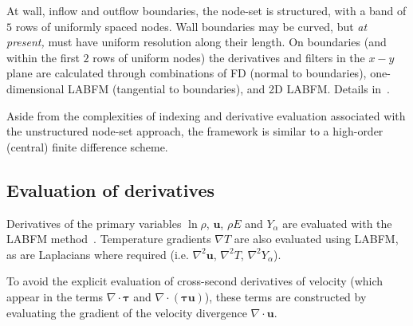\documentclass[notitlepage]{article}
\begin{document}
At wall, inflow and outflow boundaries, the node-set is structured, with a band of $5$ rows of uniformly spaced nodes. Wall boundaries may be curved, but \emph{at present,} must have uniform resolution along their length. On boundaries (and within the first $2$ rows of uniform nodes) the derivatives and filters in the $x-y$ plane are calculated through combinations of FD (normal to boundaries), one-dimensional LABFM (tangential to boundaries), and 2D LABFM. Details in~\cite{king_labfm_2022}.

Aside from the complexities of indexing and derivative evaluation associated with the unstructured node-set approach, the framework is similar to a high-order (central) finite difference scheme.

\subsection{Evaluation of derivatives}

Derivatives of the primary variables $\ln\rho$, $\bm{u}$, $\rho{E}$ and $Y_{\alpha}$ are evaluated with the LABFM method~\cite{king_labfm_2022}. Temperature gradients $\nabla{T}$ are also evaluated using LABFM, as are Laplacians where required (i.e. $\nabla^{2}\bm{u}$, $\nabla^{2}{T}$, $\nabla^{2}Y_{\alpha}$). 

To avoid the explicit evaluation of cross-second derivatives of velocity (which appear in the terms $\nabla\cdot\bm{\tau}$ and $\nabla\cdot\left(\bm{\tau}\bm{u}\right)$), these terms are constructed by evaluating the gradient of the velocity divergence $\nabla\cdot\bm{u}$.
\end{document}
